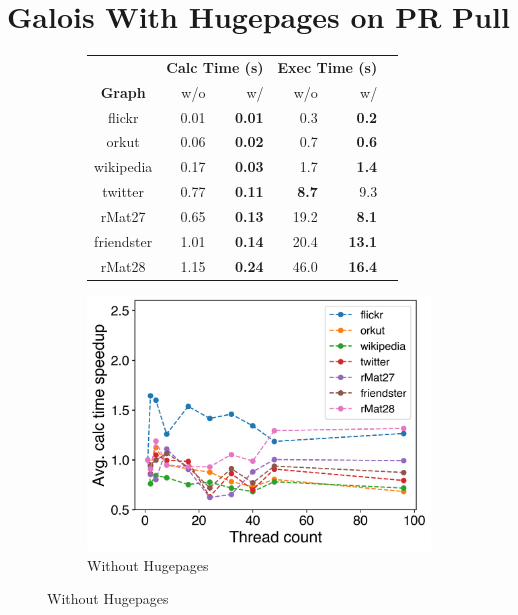 \documentclass{meetings}
\begin{document}
\section{Galois With Hugepages on PR Pull}
\begin{figure}[h!]
\hfil
\begin{subfigure}{0.33\linewidth}
	\sffamily
	\small
	\centering
	\begin{tabular}{cr@{\tabskip 2 \tabcolsep}rr@{\tabskip 2 \tabcolsep}rc}
		&\multicolumn{2}{c}{\bf Calc Time (s)}&\multicolumn{2}{c}{\bf Exec Time (s)}\\
		\cmidrule{2-3}\cmidrule{4-5}
		\bf Graph&w/o&w/&w/o&w/\\
		\midrule
		flickr & 0.01 & \bf 0.01 & 0.3 & \bf 0.2\\
		orkut & 0.06 & \bf 0.02 & 0.7 & \bf 0.6\\
		wikipedia & 0.17 & \bf 0.03 & 1.7 & \bf 1.4\\
		twitter & 0.77 & \bf 0.11 & \bf 8.7 & 9.3\\
		rMat27 & 0.65 & \bf 0.13 & 19.2 & \bf 8.1\\
		friendster & 1.01 & \bf 0.14 & 20.4 & \bf 13.1\\
		rMat28 & 1.15 & \bf 0.24 & 46.0 & \bf 16.4\\
\end{tabular}
\end{subfigure}
\hfil
	\begin{subfigure}{0.3\linewidth}
	\centering
\includegraphics[width=\linewidth]{../../plots/singleNodePRPullGaloisThreads.png}
		\caption{Without Hugepages}
\end{subfigure}

\end{figure}
\end{document}
